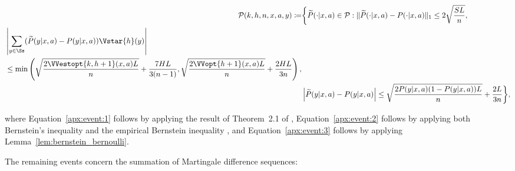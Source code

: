 \begin{align}
    \mathcal{P}(k, h, n,x,a,y) \coloneqq &\bigg\{ \widetilde{P}(\cdot | x,a) \in \mathcal{P} : \| \widetilde{P}(\cdot | x,a) - P(\cdot | x,a) \|_1 \le 2 \sqrt{\frac{SL}{n}}, \label{apx:event:1} \\
    \begin{split}
    \label{apx:event:2}
    & \left| \sum_{y\in\Ss} (\widetilde{P}(y|x,a) - P(y|x,a) ) \Vstar{h}(y) \right| \\
    &\le \min \left( \sqrt{\frac{2 \VVestopt{k,h+1}(x,a)L}{n}} + \frac{7 HL}{3 (n-1)}, \sqrt{\frac{2 \VVopt{h+1}(x, a) L}{n}} + \frac{2HL}{3n} \right),
    \end{split} \\
    & \left| \widetilde{P}(y|x,a) - P(y|x,a) \right| \le \sqrt{\frac{2 P(y|x,a) (1-P(y|x,a)) L}{n}} + \frac{2L}{3n}\bigg\},\label{apx:event:3}
\end{align}

where Equation~\eqref{apx:event:1} follows by applying the result of Theorem~{2.1} of \cite{weissman2003}, Equation~\eqref{apx:event:2} follows by applying both Bernstein's inequality \citep[see, \eg][]{cesabianchi2006} and the empirical Bernstein inequality \citep{maurer2009}, and Equation~\eqref{apx:event:3} follows by applying Lemma~\ref{lem:bernstein_bernoulli}.

The remaining events concern the summation of Martingale difference sequences:

